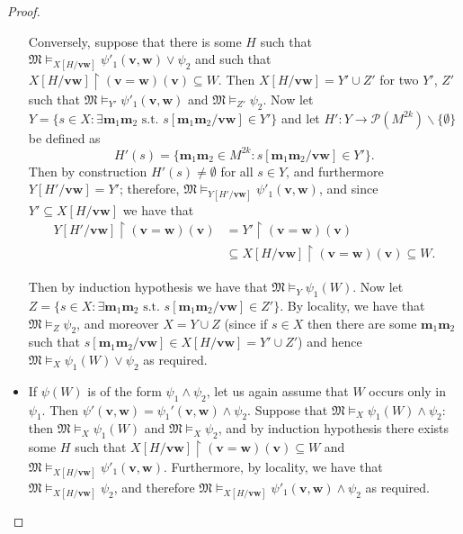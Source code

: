 \documentclass{article}
\theoremstyle{definition}
\newcommand{\tuple}{\mathbf}
\newcommand{\M}{\mathfrak M}
\newcommand{\parts}{\mathcal P}
\begin{document}
\begin{proof}
\begin{itemize}
			Conversely, suppose that there is some $H$ such that \\$\M \models_{X[H/\tuple v \tuple w]} \psi'_1(\tuple v, \tuple w) \vee \psi_2$ and such that $X[H/\tuple v \tuple w]\upharpoonright (\tuple v = \tuple w)(\tuple v) \subseteq W$. Then $X[H/\tuple v\tuple w] = Y' \cup Z'$ for two $Y'$, $Z'$ such that $\M \models_{Y'} \psi'_1(\tuple v, \tuple w)$ and $\M \models_{Z'} \psi_2$. Now let $Y = \{s \in X: \exists \tuple m_1 \tuple m_2 \text{ s.t. } s[\tuple m_1 \tuple m_2/ \tuple v \tuple w] \in Y'\}$ and let $H': Y \rightarrow \parts(M^{2k}) \backslash \{\emptyset\}$ be defined as 
			\[
				H'(s) = \{\tuple m_1 \tuple m_2 \in M^{2 k} : s[\tuple m_1 \tuple m_2/\tuple v \tuple w] \in Y'\}.
			\]
			Then by construction $H'(s) \not = \emptyset$ for all $s \in Y$, and furthermore $Y[H'/\tuple v \tuple w] = Y'$; therefore, $\M \models_{Y[H'/\tuple v \tuple w]} \psi'_1(\tuple v, \tuple w)$, and since $Y' \subseteq X[H/\tuple v \tuple w]$ we have that  %
\begin{align*}
Y[H'/\tuple v\tuple w] \upharpoonright (\tuple v = \tuple w)(\tuple v) &= 
Y'\upharpoonright(\tuple v = \tuple w)(\tuple v)\\
& \subseteq 
X[H/\tuple v\tuple w]\upharpoonright (\tuple v = \tuple w)(\tuple v) \subseteq W.
\end{align*}

 Then by induction hypothesis we have that $\M \models_Y \psi_1(W)$. Now let $Z = \{s \in X : \exists \tuple m_1 \tuple m_2 \text{ s.t. } s[\tuple m_1 \tuple m_2/\tuple v \tuple w] \in Z'\}$. By locality, we have that $\M \models_Z \psi_2$, and moreover $X = Y \cup Z$ (since if $s \in X$ then there are some $\tuple m_1 \tuple m_2$ such that $s[\tuple m_1 \tuple m_2/\tuple v \tuple w] \in X[H/\tuple v \tuple w] = Y' \cup Z'$) and hence $\M \models_X \psi_1(W) \vee \psi_2$ as required. 

		\item If $\psi(W)$ is of the form $\psi_1 \wedge \psi_2$, let us again assume that $W$ occurs only in $\psi_1$. Then $\psi'(\tuple v, \tuple w) = \psi_1'(\tuple v, \tuple w) \wedge \psi_2$. Suppose that $\M \models_X \psi_1(W) \wedge \psi_2$: then $\M \models_X \psi_1(W)$ and $\M \models_X \psi_2$, and by induction hypothesis there exists some $H$ such that $X[H/\tuple v \tuple w]\upharpoonright (\tuple v = \tuple w)(\tuple v) \subseteq W$ and $\M \models_{X[H/\tuple v \tuple w]} \psi'_1(\tuple v, \tuple w)$. Furthermore, by locality, we have that $\M \models_{X[H / \tuple v \tuple w]} \psi_2$, and therefore $\M \models_{X[H/\tuple v \tuple w]} \psi'_1 (\tuple v,\tuple w)\wedge \psi_2$ as required. 


\end{itemize}
\end{proof}
\end{document}
